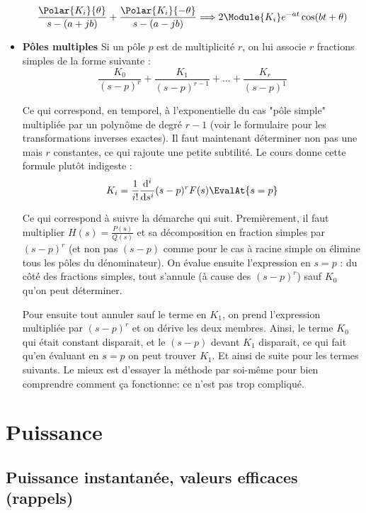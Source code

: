 \begin{itemize}
\begin{equation}
\frac{\Polar{K_i}{\theta}}{s - (a + jb)} + \frac{\Polar{K_i}{- \theta}}{s - (a - jb)} \Longrightarrow 2 \Module{K_i} e^{-at} \cos(bt + \theta)
\end{equation}

\item \textbf{Pôles multiples}
Si un pôle $p$ est de multiplicité $r$, on lui associe $r$ fractions simples de la forme suivante :
\begin{equation}
\frac{K_0}{(s-p)^r} + \frac{K_1}{(s-p)^{r-1}} + ... + \frac{K_r}{(s-p)^1}
\end{equation}

Ce qui correspond, en temporel, à l'exponentielle du cas "pôle simple" multipliée par un polynôme de degré $r-1$ (voir le formulaire pour les transformations inverses exactes). Il faut maintenant déterminer non pas une mais $r$ constantes, ce qui rajoute une petite subtilité. Le cours donne cette formule plutôt indigeste :
\begin{equation}
K_i = \frac{1}{i!}\frac{\mathrm{d}^i}{\mathrm{d}s^i}(s-p)^rF(s)\EvalAt{s=p}
\end{equation}

Ce qui correspond à suivre la démarche qui suit. Premièrement, il faut multiplier $H(s) = \frac{P(s)}{Q(s)}$ et sa décomposition en fraction simples par $(s-p)^r$ (et non pas $(s-p)$ comme pour le cas à racine simple on élimine tous les pôles du dénominateur). On évalue ensuite l'expression en $s = p$ : du côté des fractions simples, tout s'annule (à cause des $(s-p)^r$) sauf $K_0$ qu'on peut déterminer.

Pour ensuite tout annuler sauf le terme en $K_1$, on prend l'expression multipliée par $(s-p)^r$ et on dérive les deux membres. Ainsi, le terme $K_0$ qui était constant disparait, et le $(s-p)$ devant $K_1$ disparait, ce qui fait qu'en évaluant en $s = p$ on peut trouver $K_1$. Et ainsi de suite pour les termes suivants. Le mieux est d'essayer la méthode par soi-même pour bien comprendre comment ça fonctionne: ce n'est pas trop compliqué.

\end{itemize}


\section{Puissance}
\subsection{Puissance instantanée, valeurs efficaces (rappels)}
